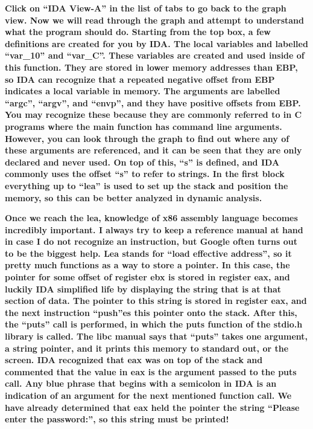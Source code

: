 \documentclass[letterpaper]{article}
\newcommand{\sitfig}[3]{
\begin{figure}[H]
\centering
\makebox[\textwidth][c]{
#2
}
\label{#1}
\end{figure}
}
\newcommand{\sitgfx}[4][scale=1.0]{
\sitfig{#3}{\texttt{[image: \#2]}}{#4}
}
\begin{document}
\textbf{Click on ``IDA View-A'' in the list of tabs to go back to the graph view. Now we will read through the graph and
attempt to understand what the program should do. Starting from the top box, a few definitions are created for you by
IDA. The local variables and labelled ``var\_10'' and ``var\_C''. These variables are created and used inside of this
function. They are stored in lower memory addresses than EBP, so IDA can recognize that a repeated negative offset from
EBP indicates a local variable in memory. The arguments are labelled ``argc'', ``argv'', and ``envp'', and they have
positive offsets from EBP. You may recognize these because they are commonly referred to in C programs where the main
function has command line arguments. However, you can look through the graph to find out where any of these arguments
are referenced, and it can be seen that they are only declared and never used. On top of this, ``s'' is defined, and
IDA commonly uses the offset ``s'' to refer to strings. In the first block everything up to ``lea'' is used to set up
the stack and position the memory, so this can be better analyzed in dynamic analysis. }  
\sitgfx[width=6.4583in,height=2.4791in]{reversing-img047.png}{fig:unk}{TODO CAPTION}
 \textbf{Once we reach the lea, knowledge of x86 assembly language becomes incredibly important. I always try to keep a
reference manual at hand in case I do not recognize an instruction, but Google often turns out to be the biggest help.
Lea stands for ``load effective address'', so it pretty much functions as a way to store a pointer. In this case, the
pointer for some offset of register ebx is stored in register eax, and luckily IDA simplified life by displaying the
string that is at that section of data. The pointer to this string is stored in register eax, and the next instruction
``push''es this pointer onto the stack. After this, the ``puts'' call is performed, in which the puts function of the
stdio.h library is called. The libc manual says that ``puts'' takes one argument, a string pointer, and it prints this
memory to standard out, or the screen. IDA recognized that eax was on top of the stack and commented that the value in
eax is the argument passed to the puts call. Any blue phrase that begins with a semicolon in IDA is an indication of an
argument for the next mentioned function call. We have already determined that eax held the pointer the string ``Please
enter the password:'', so this string must be printed!}
\end{document}

